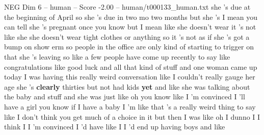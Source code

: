 \begin{textsample}{NEG Dim 6 – human – Score -2.00 – human/t000133\_human.txt}  \label{ex:f6_neg_036}
she 's due at the beginning of April so she 's due in two mo two months but she 's I mean you can tell she 's pregnant once you know but I mean like she doesn't wear it 's not like she she doesn't wear tight clothes or anything so it 's not as if she 's got a bump on show erm so people in the office are only kind of starting to trigger on that she 's leaving so like a few people have come up recently to say like congratulations like good luck and all that kind of stuff and one woman came up today I was having this really weird conversation like I couldn't really gauge her age she 's \textbf{clearly} thirties but not had kids \textbf{yet} and like she was talking about the baby and stuff and she was just like oh you know like I 'm convinced I 'll have a girl you know if I have a baby I 'm like that 's a really weird thing to say like I don't think you get much of a choice in it but then I was like oh I dunno I I think I I 'm convinced I 'd have like I I 'd end up having boys and like

\end{textsample}
